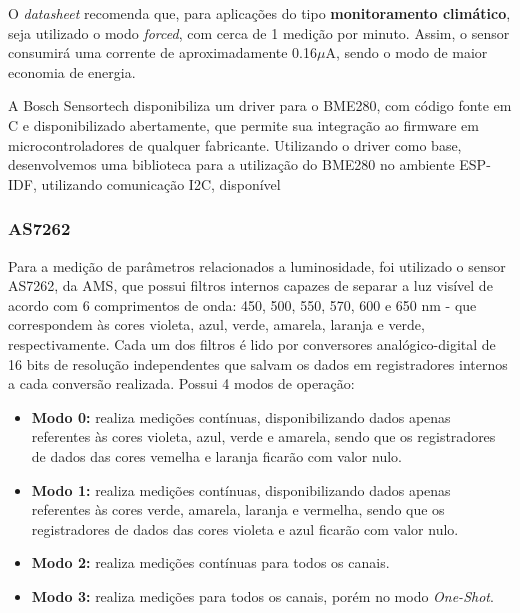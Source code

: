 \documentclass[../monografia.tex]{subfiles}
\begin{document}
O \textit{datasheet} recomenda que, para aplicações do tipo \textbf{monitoramento climático}, seja utilizado o modo \textit{forced}, com cerca de 1 medição por minuto. Assim, o sensor consumirá uma corrente de aproximadamente 0.16$\mu$A, sendo o modo de maior economia de energia. 

A Bosch Sensortech disponibiliza um driver para o BME280, com código fonte em C e disponibilizado abertamente\cite{bme280-driver}, que permite sua integração ao firmware em microcontroladores de qualquer fabricante. 
Utilizando o driver como base, desenvolvemos uma biblioteca para a utilização do BME280 no ambiente ESP-IDF, utilizando comunicação I2C, disponível



\subsubsection{AS7262}

Para a medição de parâmetros relacionados a luminosidade, foi utilizado o sensor AS7262, da AMS, que possui filtros internos capazes de separar a luz visível de acordo com 6 comprimentos de onda: 450, 500, 550, 570, 600 e 650 nm - que correspondem às cores violeta, azul, verde, amarela, laranja e verde, respectivamente. Cada um dos filtros é lido por conversores analógico-digital de 16 bits de resolução independentes que salvam os dados em registradores internos a cada conversão realizada. Possui 4 modos de operação:

\begin{itemize}
	\item \textbf{Modo 0:} realiza medições contínuas, disponibilizando dados apenas referentes às cores violeta, azul, verde e amarela, sendo que os registradores de dados das cores vemelha e laranja ficarão com valor nulo.
	\item \textbf{Modo 1:} realiza medições contínuas, disponibilizando dados apenas referentes às cores verde, amarela, laranja e vermelha, sendo que os registradores de dados das cores violeta e azul ficarão com valor nulo.
	\item \textbf{Modo 2:} realiza medições contínuas para todos os canais.
	\item \textbf{Modo 3:} realiza medições para todos os canais, porém no modo \textit{One-Shot}.
\end{itemize}
\end{document}
